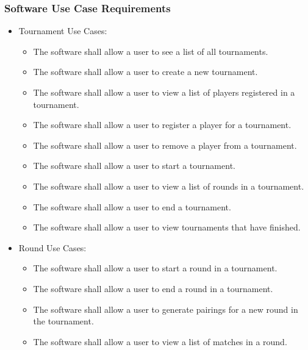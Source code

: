 \documentclass[11pt]{article}
\begin{document}
        \subsubsection{Software Use Case Requirements}
            \begin{itemize}
            \item Tournament Use Cases:
            \begin{itemize}
                \item The software shall allow a user to see a list of all tournaments.
                \item The software shall allow a user to create a new tournament.
                \item The software shall allow a user to view a list of players registered in a tournament.
                \item The software shall allow a user to register a player for a tournament.
                \item The software shall allow a user to remove a player from a tournament.
                \item The software shall allow a user to start a tournament.
                \item The software shall allow a user to view a list of rounds in a tournament.
                \item The software shall allow a user to end a tournament.
                \item The software shall allow a user to view tournaments that have finished.
            \end{itemize}


            \item Round Use Cases:
            \begin{itemize}
                \item The software shall allow a user to start a round in a tournament.
                \item The software shall allow a user to end a round in a tournament.
                \item The software shall allow a user to generate pairings for a new round in the tournament.
                \item The software shall allow a user to view a list of matches in a round.
            \end{itemize}


\end{itemize}
\end{document}
